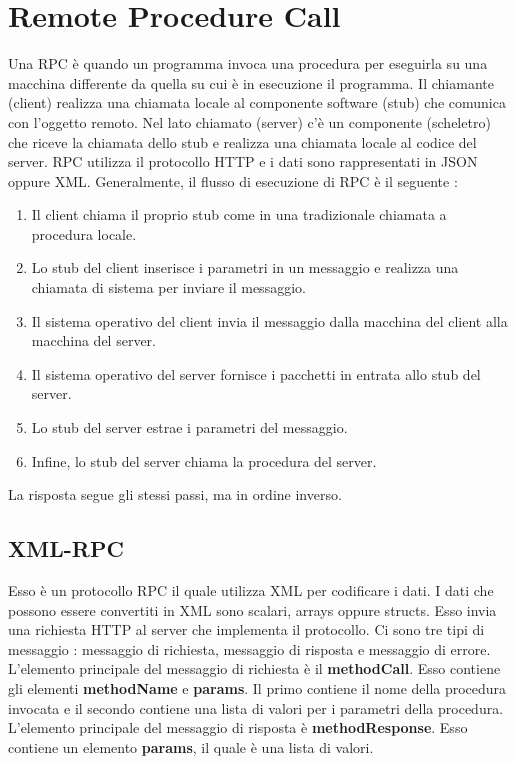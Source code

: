 \documentclass[12pt]{report}
\begin{document}
\section{Remote Procedure Call}
Una RPC è quando un programma invoca una procedura per eseguirla su una macchina differente da quella su cui è in esecuzione il programma. Il chiamante (client) realizza una chiamata locale al componente software (stub) che comunica con l'oggetto remoto. Nel lato chiamato (server) c'è un componente (scheletro) che riceve la chiamata dello stub e realizza una chiamata locale al codice del server. RPC utilizza il protocollo HTTP e i dati sono rappresentati in JSON oppure XML. Generalmente, il flusso di esecuzione di RPC è il seguente :
\begin{enumerate}
\item Il client chiama il proprio stub come in una tradizionale chiamata a procedura locale.
\item Lo stub del client inserisce i parametri in un messaggio e realizza una chiamata di sistema per inviare il messaggio.
\item Il sistema operativo del client invia il messaggio dalla macchina del client alla macchina del server.
\item Il sistema operativo del server fornisce i pacchetti in entrata allo stub del server.
\item Lo stub del server estrae i parametri del messaggio.
\item Infine, lo stub del server chiama la procedura del server.
\end{enumerate}
La risposta segue gli stessi passi, ma in ordine inverso.
\subsection{XML-RPC}
Esso è un protocollo RPC il quale utilizza XML per codificare i dati. I dati che possono essere convertiti in XML sono scalari, arrays oppure structs. Esso invia una richiesta HTTP al server che implementa il protocollo. Ci sono tre tipi di messaggio : messaggio di richiesta, messaggio di risposta e messaggio di errore. L'elemento principale del messaggio di richiesta è il \textbf{methodCall}. Esso contiene gli elementi \textbf{methodName} e \textbf{params}. Il primo contiene il nome della procedura invocata e il secondo contiene una lista di valori per i parametri della procedura. L'elemento principale del messaggio di risposta è \textbf{methodResponse}. Esso contiene un elemento \textbf{params}, il quale è una lista di valori.
\end{document}

